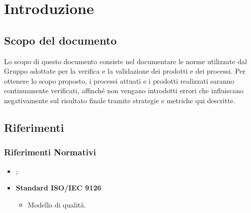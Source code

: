 \documentclass[PianoDiQualifica.tex]{subfiles}
\begin{document}
\chapter{Introduzione}

	\section{Scopo del documento}
	Lo scopo di questo documento consiste nel documentare le norme utilizzate dal Gruppo \gruppo adottate per la verifica e la validazione dei prodotti e dei processi. Per ottenere lo scopo proposto, i processi attuati e i prodotti realizzati saranno continuamente verificati, affinché non vengano introdotti errori che influiscano negativamente sul risultato finale tramite strategie e metriche qui descritte.
	
	\scopoProdotto
	
	\glossExpl
	
	\section{Riferimenti}
		\subsection{Riferimenti Normativi}
		\begin{itemize}
			\item \textbf{\ndp \vruno};
			\item \textbf{Standard ISO/IEC 9126}\\
			\begin{itemize}
				\item Modello di qualità.
			\end{itemize}
		\end{itemize}
		
\end{document}
